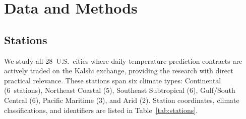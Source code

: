 \documentclass{ametsocV6.1}
\begin{document}
\section{Data and Methods}
\label{sec:methods}

\subsection{Stations}
\label{sec:stations}

We study all 28~U.S.\ cities where daily temperature prediction contracts are
actively traded on the Kalshi exchange, providing the research with direct practical
relevance. These stations span six climate types: Continental (6~stations),
Northeast Coastal (5), Southeast Subtropical (6), Gulf/South Central (6), Pacific
Maritime (3), and Arid (2). Station coordinates, climate classifications, and
identifiers are listed in Table~\ref{tab:stations}.
\end{document}

